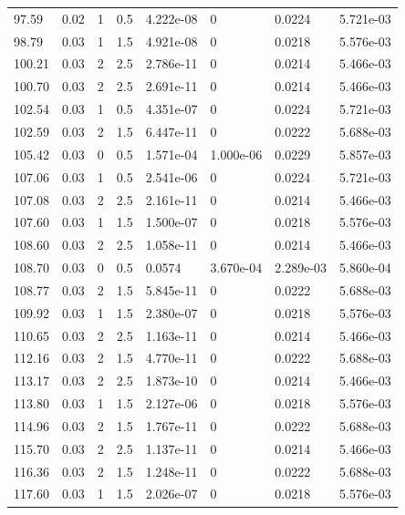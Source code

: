 \documentclass[preview]{standalone}
\begin{document}
{{{\begin{tabular}{L{1.2cm}C{1.2cm} C{0.3cm}C{0.5cm} C{1.4cm}C{1.4cm} C{1.4cm}C{1.4cm}}
  97.59  &  0.02  & 1     & 0.5 &  4.222e-08  & 0  & 0.0224 &  5.721e-03   \\ 
  98.79  &  0.03  & 1     & 1.5 &  4.921e-08  & 0  & 0.0218 &  5.576e-03   \\ 
  100.21  &  0.03  & 2     & 2.5 &  2.786e-11  & 0  & 0.0214 &  5.466e-03   \\ 
  100.70  &  0.03  & 2     & 2.5 &  2.691e-11  & 0  & 0.0214 &  5.466e-03   \\ 
  102.54  &  0.03  & 1     & 0.5 &  4.351e-07  & 0  & 0.0224 &  5.721e-03   \\ 
  102.59  &  0.03  & 2     & 1.5 &  6.447e-11  & 0  & 0.0222 &  5.688e-03   \\ 
  105.42  &  0.03  & 0     & 0.5 &  1.571e-04  & 1.000e-06  & 0.0229 &  5.857e-03   \\ 
  107.06  &  0.03  & 1     & 0.5 &  2.541e-06  & 0  & 0.0224 &  5.721e-03   \\ 
  107.08  &  0.03  & 2     & 2.5 &  2.161e-11  & 0  & 0.0214 &  5.466e-03   \\ 
  107.60  &  0.03  & 1     & 1.5 &  1.500e-07  & 0  & 0.0218 &  5.576e-03   \\ 
  108.60  &  0.03  & 2     & 2.5 &  1.058e-11  & 0  & 0.0214 &  5.466e-03   \\ 
  108.70  &  0.03  & 0     & 0.5 &  0.0574  & 3.670e-04  & 2.289e-03 &  5.860e-04   \\ 
  108.77  &  0.03  & 2     & 1.5 &  5.845e-11  & 0  & 0.0222 &  5.688e-03   \\ 
  109.92  &  0.03  & 1     & 1.5 &  2.380e-07  & 0  & 0.0218 &  5.576e-03   \\ 
  110.65  &  0.03  & 2     & 2.5 &  1.163e-11  & 0  & 0.0214 &  5.466e-03   \\ 
  112.16  &  0.03  & 2     & 1.5 &  4.770e-11  & 0  & 0.0222 &  5.688e-03   \\ 
  113.17  &  0.03  & 2     & 2.5 &  1.873e-10  & 0  & 0.0214 &  5.466e-03   \\ 
  113.80  &  0.03  & 1     & 1.5 &  2.127e-06  & 0  & 0.0218 &  5.576e-03   \\ 
  114.96  &  0.03  & 2     & 1.5 &  1.767e-11  & 0  & 0.0222 &  5.688e-03   \\ 
  115.70  &  0.03  & 2     & 2.5 &  1.137e-11  & 0  & 0.0214 &  5.466e-03   \\ 
  116.36  &  0.03  & 2     & 1.5 &  1.248e-11  & 0  & 0.0222 &  5.688e-03   \\ 
  117.60  &  0.03  & 1     & 1.5 &  2.026e-07  & 0  & 0.0218 &  5.576e-03   \\ 

\end{tabular}}}}
\end{document}
